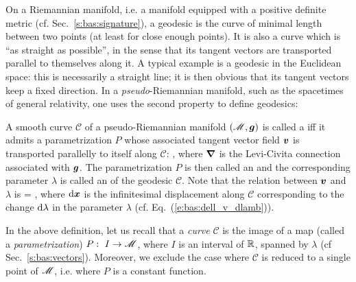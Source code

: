 On a Riemannian manifold, i.e. a manifold equipped with a positive definite metric
(cf. Sec.~\ref{s:bas:signature}), a geodesic is the curve of minimal length between
two points (at least for close enough points). It is also a curve which is
``as straight as possible'', in the sense that its tangent vectors are transported parallel
to themselves along it. A typical example is a geodesic in the Euclidean space: this is
necessarily a straight line; it is then obvious that its tangent vectors
keep a fixed direction. In a \emph{pseudo}-Riemannian manifold, such as the
spacetimes of general relativity, one uses
the second property to define geodesics:
\begin{greybox}
A smooth curve $\mathcal{C}$ of a pseudo-Riemannian manifold $(\mathscr{M},\bm{g})$ is
called a  iff it admits a parametrization $P$ whose associated
tangent vector field $\bm{v}$ is transported parallelly to itself along
$\mathcal{C}$:
\be \label{e:geo:geod_eq_v}
    ,
\ee
where $\bm{\nabla}$ is the Levi-Civita connection associated with $\bm{g}$.
The parametrization $P$ is then called an
and the corresponding parameter $\lambda$ is called an
 of the
geodesic $\mathcal{C}$. Note that the relation between $\bm{v}$ and $\lambda$ is
\be \label{e:geo:v_dxdlambda}
     =  ,
\ee
where $\mathrm{d}\bm{x}$ is the infinitesimal displacement along $\mathcal{C}$ corresponding
to the change $\mathrm{d}\lambda$ in the parameter $\lambda$
(cf. Eq.~(\ref{e:bas:dell_v_dlamb})).
\end{greybox}
In the above definition, let us recall that a \emph{curve} $\mathcal{C}$ is the image of a map (called
a \emph{parametrization}) $P:\ I\rightarrow \mathscr{M}$,
where $I$ is an interval of $\mathbb{R}$, spanned by $\lambda$ (cf Sec.~\ref{s:bas:vectors}).
Moreover, we exclude the case where $\mathcal{C}$ is reduced to a single point
of $\mathscr{M}$, i.e. where $P$ is a constant function.

